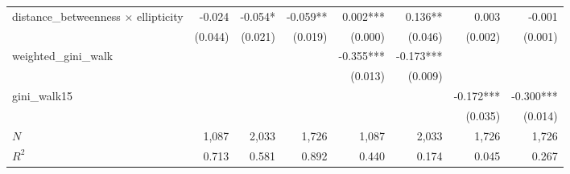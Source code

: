 \begin{tabular}{lrrrrrrr}
distance\_betweenness $\times$ ellipticity &                       -0.024 &                    -0.054* &                     -0.059** &                         0.002*** &                        0.136** &                                                             0.003 &                                              -0.001 \\ 
                                           &                      (0.044) &                    (0.021) &                      (0.019) &                          (0.000) &                        (0.046) &                                                           (0.002) &                                             (0.001) \\ 
weighted\_gini\_walk                       &                              &                            &                              &                        -0.355*** &                      -0.173*** &                                                                   &                                                     \\ 
                                           &                              &                            &                              &                          (0.013) &                        (0.009) &                                                                   &                                                     \\ 
gini\_walk15                               &                              &                            &                              &                                  &                                &                                                         -0.172*** &                                           -0.300*** \\ 
                                           &                              &                            &                              &                                  &                                &                                                           (0.035) &                                             (0.014) \\ 
\midrule
$N$                                        &                        1,087 &                      2,033 &                        1,726 &                            1,087 &                          2,033 &                                                             1,726 &                                               1,726 \\ 
$R^2$                                      &                        0.713 &                      0.581 &                        0.892 &                            0.440 &                          0.174 &                                                             0.045 &                                               0.267 \\ 
\bottomrule
\end{tabular}
